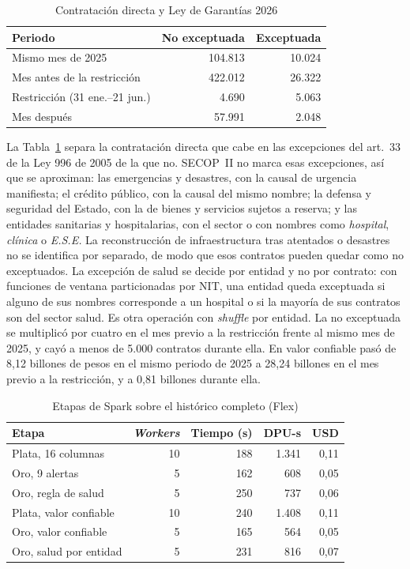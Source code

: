 \documentclass[conference]{IEEEtran}
\begin{document}
\begin{table}[htbp]
\caption{Contratación directa y Ley de Garantías 2026}
\label{tab:garantias}
\centering
\begin{tabular}{@{}lrr@{}}
\toprule
Periodo & No exceptuada & Exceptuada \\
\midrule
Mismo mes de 2025 & 104.813 & 10.024 \\
Mes antes de la restricción & 422.012 & 26.322 \\
Restricción (31 ene.--21 jun.) & 4.690 & 5.063 \\
Mes después & 57.991 & 2.048 \\
\bottomrule
\end{tabular}
\end{table}

La Tabla~\ref{tab:garantias} separa la contratación directa que cabe en las excepciones del art.~33 de la Ley 996 de 2005 de la que no. SECOP~II no marca esas excepciones, así que se aproximan: las emergencias y desastres, con la causal de urgencia manifiesta; el crédito público, con la causal del mismo nombre; la defensa y seguridad del Estado, con la de bienes y servicios sujetos a reserva; y las entidades sanitarias y hospitalarias, con el sector o con nombres como \textit{hospital}, \textit{clínica} o \textit{E.S.E.} La reconstrucción de infraestructura tras atentados o desastres no se identifica por separado, de modo que esos contratos pueden quedar como no exceptuados. La excepción de salud se decide por entidad y no por contrato: con funciones de ventana particionadas por NIT, una entidad queda exceptuada si alguno de sus nombres corresponde a un hospital o si la mayoría de sus contratos son del sector salud. Es otra operación con \textit{shuffle} por entidad. La no exceptuada se multiplicó por cuatro en el mes previo a la restricción frente al mismo mes de 2025, y cayó a menos de 5.000 contratos durante ella. En valor confiable pasó de 8,12 billones de pesos en el mismo periodo de 2025 a 28,24 billones en el mes previo a la restricción, y a 0,81 billones durante ella.

\begin{table}[htbp]
\caption{Etapas de Spark sobre el histórico completo (Flex)}
\label{tab:etapas}
\centering
\begin{tabular}{@{}lrrrr@{}}
\toprule
Etapa & \textit{Workers} & Tiempo (s) & DPU-s & USD \\
\midrule
Plata, 16 columnas & 10 & 188 & 1.341 & 0,11 \\
Oro, 9 alertas & 5 & 162 & 608 & 0,05 \\
Oro, regla de salud & 5 & 250 & 737 & 0,06 \\
Plata, valor confiable & 10 & 240 & 1.408 & 0,11 \\
Oro, valor confiable & 5 & 165 & 564 & 0,05 \\
Oro, salud por entidad & 5 & 231 & 816 & 0,07 \\
\bottomrule
\end{tabular}
\end{table}
\end{document}

